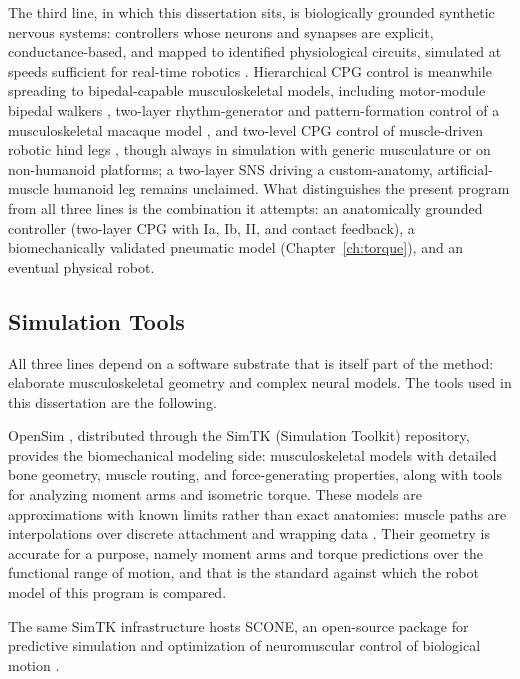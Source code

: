 The third line, in which this dissertation sits, is biologically grounded synthetic nervous systems: controllers whose neurons and synapses are explicit, conductance-based, and mapped to identified physiological circuits, simulated at speeds sufficient for real-time robotics \citep{nourse_sns_2023}. Hierarchical CPG control is meanwhile spreading to bipedal-capable musculoskeletal models, including motor-module bipedal walkers \citep{ichimura_pathological_2019}, two-layer rhythm-generator and pattern-formation control of a musculoskeletal macaque model \citep{nishizaki_gait_2026}, and two-level CPG control of muscle-driven robotic hind legs \citep{fukuoka_autonomous_2021}, though always in simulation with generic musculature or on non-humanoid platforms; a two-layer SNS driving a custom-anatomy, artificial-muscle humanoid leg remains unclaimed. What distinguishes the present program from all three lines is the combination it attempts: an anatomically grounded controller (two-layer CPG with Ia, Ib, II, and contact feedback), a biomechanically validated pneumatic model (Chapter~\ref{ch:torque}), and an eventual physical robot.

\subsection{Simulation Tools}\label{sec:bg_tools}

All three lines depend on a software substrate that is itself part of the method: elaborate musculoskeletal geometry and complex neural models. The tools used in this dissertation are the following.

OpenSim \citep{delp_opensim_2007, seth_opensim_2018}, distributed through the SimTK (Simulation Toolkit) repository, provides the biomechanical modeling side: musculoskeletal models with detailed bone geometry, muscle routing, and force-generating properties, along with tools for analyzing moment arms and isometric torque. These models are approximations with known limits rather than exact anatomies: muscle paths are interpolations over discrete attachment and wrapping data \citep{bolen_bipedal_2019}. Their geometry is accurate for a purpose, namely moment arms and torque predictions over the functional range of motion, and that is the standard against which the robot model of this program is compared. 

The same SimTK infrastructure hosts SCONE, an open-source package for predictive simulation and optimization of neuromuscular control of biological motion \citep{geijtenbeek_scone_2019}. 

